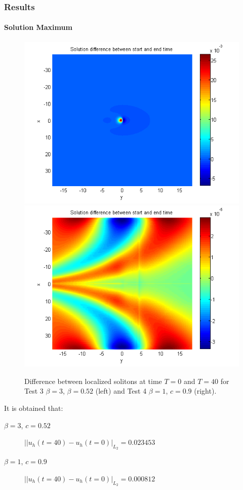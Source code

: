 \documentclass{beamer}
\begin{document}
\begin{frame}
\frametitle{Results}
\framesubtitle{Solution Maximum}
\begin{figure}[ht]
	\centering
	\begin{minipage}[b]{0.49\linewidth}
		\includegraphics[width=\linewidth]{figures/compare_start_end_bt3_c052.png}
	\end{minipage}	
	\begin{minipage}[b]{0.49\linewidth}
		 \includegraphics[width=\linewidth]{figures/compare_start_end_bt1_c09.png}
	\end{minipage}

Difference between localized solitons at time $T=0$ and $T=40$ for Test 3 $\beta = 3$, $\beta = 0.52$  (left) and Test 4 $\beta=1$, $c=0.9$ (right). 
\end{figure}

It is obtained that:
\begin{description}
 \item[$\beta = 3$, $c = 0.52$] $||u_h(t=40)-u_h(t=0)|_{L_2} = 0.023453$
 \item[$\beta = 1$, $c = 0.9$] $||u_h(t=40)-u_h(t=0)|_{L_2} = 0.000812$
\end{description}
\end{frame}
\end{document}
